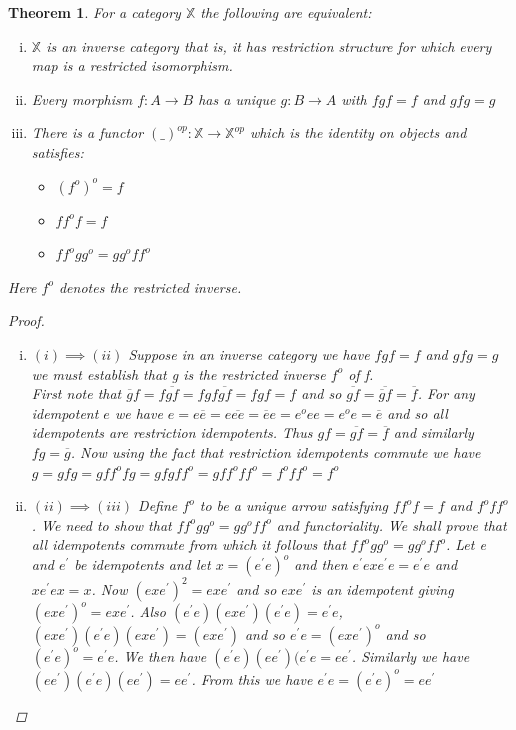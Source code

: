 \documentclass[11pt, oneside]{amsart}
\newtheorem{theorem}{Theorem}
\theoremstyle{definition}
\theoremstyle{definition}
\begin{document}
\begin{theorem}
For a category $\mathbb{X}$ the following are equivalent:
\begin{enumerate}[(i)]
    \item $\mathbb{X}$ is an inverse category that is, it has restriction structure for which every map is a restricted isomorphism.
    \item Every morphism $f:A \to B$ has a unique $g:B \to A$ with $fgf=f$ and $gfg=g$
    \item There is a functor $(\_)^{op}: \mathbb{X} \to {\mathbb{X}^{op}}$ which is the identity on objects and satisfies:
    \begin{itemize}
        \item $(f^{o})^{o}=f$
        \item $ff^{o}f=f$
        \item $ff^{o}gg^{o}=gg^{o}ff^{o}$
    \end{itemize}
\end{enumerate}
Here $f^{o}$ denotes the restricted inverse. 
\begin{proof}~
\begin{enumerate}[(i)]
    \item $(i) \implies (ii)$ Suppose in an inverse category we have $fgf=f$ and $gfg=g$
 we must establish that g is the restricted inverse $f^{o}$ of f.\\
 First note that $\overline{g}f=f\overline{gf}=fgf\overline{gf}=fgf=f$ and so $\overline{gf}=\overline{\overline{g}f}=\overline{f}$. For any idempotent $e$ we have $e=e\overline{e}=e\overline{ee}=\overline{e}e=e^{o}ee=e^{o}e=\overline{e}$ and so all idempotents are restriction idempotents. Thus $gf=\overline{gf}=\overline{f}$ and similarly $fg=\overline{g}$.
 Now using the fact that restriction idempotents commute we have $g=gfg=gff^{o}fg=gfgff^{o}=gff^{o}ff^{o}=f^{o}ff^{o}=f^{o}$
 \item $(ii) \implies (iii)$ Define $f^{o}$ to be a unique arrow satisfying $ff^{o}f=f$ and $f^{o}ff^{o}$. We need to show that $ff^{o}gg^{o}=gg^{o}ff^{o}$ and functoriality.
 We shall prove that all idempotents commute from which it follows that $ff^{o}gg^{o}=gg^{o}ff^{o}$. Let e and $e^{\prime}$ be idempotents and let $x=(e^{\prime}e)^{o}$ and then $e^{\prime}exe^{\prime}e=e^{\prime}e$ and $xe^{\prime}ex=x$. Now $(exe^{\prime})^{2}=exe^{\prime}$ and so $exe^{\prime}$ is an idempotent giving $(exe^{\prime})^{o}=exe^{\prime}$. Also $(e^{\prime}e)(exe^{\prime})(e^{\prime}e)=e^{\prime}e$, 
 $(exe^{\prime})(e^{\prime}e)(exe^{\prime})=(exe^{\prime})$ and so $e^{\prime}e=(exe^{\prime})^{o}$ and so $(e^{\prime}e)^{o}=e^{\prime}e$. We then have $(e^{\prime}e)(ee^{\prime})(e^{\prime}e=ee^{\prime}$. Similarly we have $(ee^{\prime})(e^{\prime}e)(ee^{\prime})=ee^{\prime}$. From this we have $e^{\prime}e=(e^{\prime}e)^{o}=ee^{\prime}$\\

\end{enumerate}
\end{proof}
\end{theorem}
\end{document}

